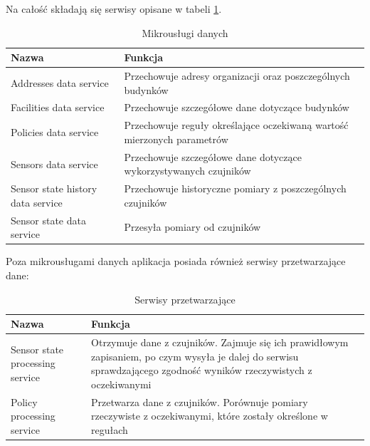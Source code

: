 \documentclass[11pt, a4]{article} %
\begin{document}
Na całość składają się serwisy opisane w tabeli \ref{tab:mikrouslugi-danych}.

\begin{table}[!ht]
    \caption{Mikrousługi danych}
    \label{tab:mikrouslugi-danych}
    \begin{tabularx}{1\textwidth} { 
        | >{\raggedright\arraybackslash}X        
        | >{\raggedleft\arraybackslash}X | }
        \hline
       Nazwa & Funkcja \\
       \hline
       Addresses data service & 
       Przechowuje adresy organizacji oraz poszczególnych budynków \\
       \hline
       Facilities data service &
       Przechowuje szczegółowe dane dotyczące budynków \\
       \hline
       Policies data service & 
       Przechowuje reguły określające oczekiwaną wartość mierzonych parametrów \\
       \hline
       Sensors data service &
       Przechowuje szczegółowe dane dotyczące wykorzystywanych czujników \\
       \hline
       Sensor state history data service &
       Przechowuje historyczne pomiary z poszczególnych czujników \\
       \hline
       Sensor state data service &
       Przesyła pomiary od czujników \\
       \hline
    \end{tabularx}
\end{table}

Poza mikrousługami danych aplikacja posiada również serwisy przetwarzające dane:

\begin{table}[!ht]
    \caption{Serwisy przetwarzające}
    \label{tab:serwisy-przetwarzajace}
    \begin{tabularx}{1\textwidth} { 
        | >{\raggedright\arraybackslash}X        
        | >{\raggedleft\arraybackslash}X | }
        \hline
       Nazwa & Funkcja \\
       \hline
       Sensor state processing service & 
       Otrzymuje dane z czujników. Zajmuje się ich prawidłowym zapisaniem, po czym wysyła 
       je dalej do serwisu sprawdzającego zgodność wyników rzeczywistych z oczekiwanymi \\
       \hline
       Policy processing service &
       Przetwarza dane z czujników. Porównuje pomiary rzeczywiste z oczekiwanymi, które 
       zostały określone w regułach \\
       \hline
    \end{tabularx}
\end{table}
\end{document}

